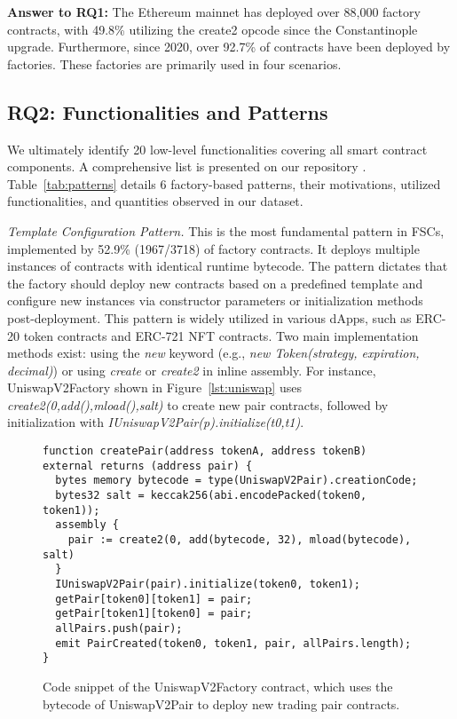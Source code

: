 \documentclass[acmsmall,screen]{acmart}
\begin{document}
	\begin{answerbox}
		\textbf{Answer to RQ1:} The Ethereum mainnet has deployed over 88,000 factory contracts, with 49.8\% utilizing the create2 opcode since the Constantinople upgrade. Furthermore, since 2020, over 92.7\% of contracts have been deployed by factories. These factories are primarily used in four scenarios.
	\end{answerbox}


	\subsection{RQ2: Functionalities and Patterns}\label{sec:4.3}
	We ultimately identify 20 low-level functionalities covering all smart contract components. A comprehensive list is presented on our repository \cite{fscdata}. Table~\ref{tab:patterns} details 6 factory-based patterns, their motivations, utilized functionalities, and quantities observed in our dataset.

% 

	\textit{Template Configuration Pattern.} This is the most fundamental pattern in FSCs, implemented by 52.9\% (1967/3718) of factory contracts. It deploys multiple instances of contracts with identical runtime bytecode. The pattern dictates that the factory should deploy new contracts based on a predefined template and configure new instances via constructor parameters or initialization methods post-deployment. This pattern is widely utilized in various dApps, such as ERC-20 token contracts and ERC-721 NFT contracts.
	Two main implementation methods exist: using the \textit{new} keyword (e.g., \textit{new Token(strategy, expiration, decimal)}) or using \textit{create} or \textit{create2} in inline assembly. For instance, UniswapV2Factory \cite{uniswapv2factory} shown in Figure~\ref{lst:uniswap} uses \textit{create2(0,add(),mload(),salt)} to create new pair contracts, followed by initialization with \textit{IUniswapV2Pair(p).initialize(t0,t1)}.

	\begin{figure}[h]
		\begin{minipage}{\linewidth}
			\begin{lstlisting}
function createPair(address tokenA, address tokenB) external returns (address pair) {
  bytes memory bytecode = type(UniswapV2Pair).creationCode;
  bytes32 salt = keccak256(abi.encodePacked(token0, token1));
  assembly {
    pair := create2(0, add(bytecode, 32), mload(bytecode), salt)
  }
  IUniswapV2Pair(pair).initialize(token0, token1);
  getPair[token0][token1] = pair;
  getPair[token1][token0] = pair;
  allPairs.push(pair);
  emit PairCreated(token0, token1, pair, allPairs.length);
}
			\end{lstlisting}
		\end{minipage}
		\caption{Code snippet of the UniswapV2Factory contract, which uses the bytecode of UniswapV2Pair to deploy new trading pair contracts.}
		\label{list:uniswap}
	\end{figure}
\end{document}

